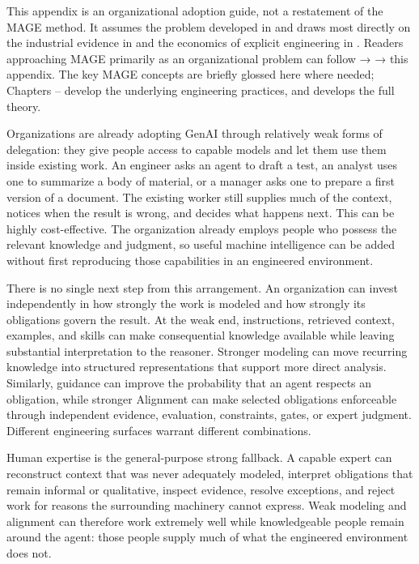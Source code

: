 

This appendix is an organizational adoption guide, not a restatement of the MAGE method. It assumes the problem developed in  and draws most directly on the industrial evidence in  and the economics of explicit engineering in . Readers approaching MAGE primarily as an organizational problem can follow  →  → this appendix. The key MAGE concepts are briefly glossed here where needed; Chapters -- develop the underlying engineering practices, and  develops the full theory.

Organizations are already adopting GenAI through relatively weak forms of delegation: they give people access to capable models and let them use them inside existing work. An engineer asks an agent to draft a test, an analyst uses one to summarize a body of material, or a manager asks one to prepare a first version of a document. The existing worker still supplies much of the context, notices when the result is wrong, and decides what happens next. This can be highly cost-effective. The organization already employs people who possess the relevant knowledge and judgment, so useful machine intelligence can be added without first reproducing those capabilities in an engineered environment.

There is no single next step from this arrangement. An organization can invest independently in how strongly the work is modeled and how strongly its obligations govern the result. At the weak end, instructions, retrieved context, examples, and skills can make consequential knowledge available while leaving substantial interpretation to the reasoner. Stronger modeling can move recurring knowledge into structured representations that support more direct analysis. Similarly, guidance can improve the probability that an agent respects an obligation, while stronger Alignment can make selected obligations enforceable through independent evidence, evaluation, constraints, gates, or expert judgment. Different engineering surfaces warrant different combinations.

Human expertise is the general-purpose strong fallback. A capable expert can reconstruct context that was never adequately modeled, interpret obligations that remain informal or qualitative, inspect evidence, resolve exceptions, and reject work for reasons the surrounding machinery cannot express. Weak modeling and alignment can therefore work extremely well while knowledgeable people remain around the agent: those people supply much of what the engineered environment does not.

